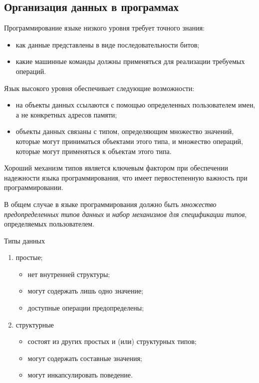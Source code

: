 \documentclass{beamer}
\begin{document}
\subsection{Организация данных в программах}
\begin{frame}[t]
Программирование языке низкого уровня требует точного знания: 
\begin{itemize}
\item как данные представлены в виде последовательности битов;
\item какие машинные команды должны применяться для реализации требуемых операций.
\end{itemize}
Язык высокого уровня обеспечивает следующие возможности:
\begin{itemize}
\item на объекты данных ссылаются с помощью определенных пользователем имен, а не конкретных адресов памяти;
\item объекты данных связаны с типом, определяющим множество значений, которые могут приниматься объектами этого типа, и множество операций, которые могут применяться к объектам этого типа.
\end{itemize}
Хороший механизм типов является ключевым фактором при обеспечении
надежности языка программирования, что имеет первостепенную важность при программировании.
\end{frame} 

\begin{frame}[c]
В общем случае в языке программирования должно быть \emph{множество предопределенных типов данных} и \emph{набор механизмов для спецификации типов}, определяемых пользователем.
\begin{block}{Типы данных}
\begin{enumerate}
\item простые;
	\begin{itemize}
	\item нет внутренней структуры;
	\item могут содержать лишь одно значение;
	\item доступные операции предопределены;	
	\end{itemize}
\item структурные
	\begin{itemize}
	\item состоят из других простых и (или) структурных типов;
	\item могут содержать составные значения;
	\item могут инкапсулировать поведение.	
	\end{itemize}
\end{enumerate}
\end{block}
\end{frame}  
\end{document}
